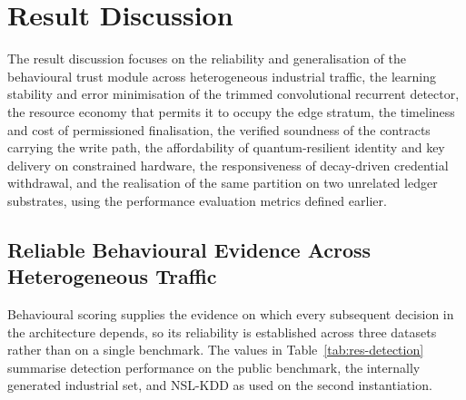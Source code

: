 \section{Result Discussion}
\label{sec:eval-discussion}

The result discussion focuses on the reliability and generalisation of the behavioural trust module across heterogeneous industrial traffic, the learning stability and error minimisation of the trimmed convolutional recurrent detector, the resource economy that permits it to occupy the edge stratum, the timeliness and cost of permissioned finalisation, the verified soundness of the contracts carrying the write path, the affordability of quantum-resilient identity and key delivery on constrained hardware, the responsiveness of decay-driven credential withdrawal, and the realisation of the same partition on two unrelated ledger substrates, using the performance evaluation metrics defined earlier.

\subsection{Reliable Behavioural Evidence Across Heterogeneous Traffic}
\label{sec:eval-evidence}
 
Behavioural scoring supplies the evidence on which every subsequent decision in the architecture depends, so its reliability is established across three datasets rather than on a single benchmark. The values in Table~\ref{tab:res-detection} summarise detection performance on the public benchmark, the internally generated industrial set, and NSL-KDD as used on the second instantiation.
 
